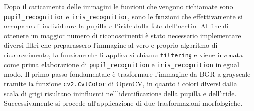 Dopo il caricamento delle immagini le funzioni che vengono richiamate sono \texttt{pupil\_recognition} e \texttt{iris\_recognition}, sono le funzioni che effettivamente si occupano di individuare la pupilla e l’iride dalla foto dell’occhio. Al fine di ottenere un maggior numero di riconoscimenti è stato necessario implementare diversi filtri che preparassero l’immagine al vero e proprio algoritmo di riconoscimento, la funzione che li applica si chiama \texttt{filtering} e viene invocata come prima elaborazione di \texttt{pupil\_recognition} e \texttt{iris\_recognition} in egual modo. Il primo passo fondamentale è trasformare l’immagine da BGR a grayscale tramite la funzione \texttt{cv2.CvtColor} di OpenCV, in quanto i colori diversi dalla scala di grigi risultano ininfluenti nell’identificazione della pupilla e dell’iride. Successivamente si procede all’applicazione di due trasformazioni morfologiche.
